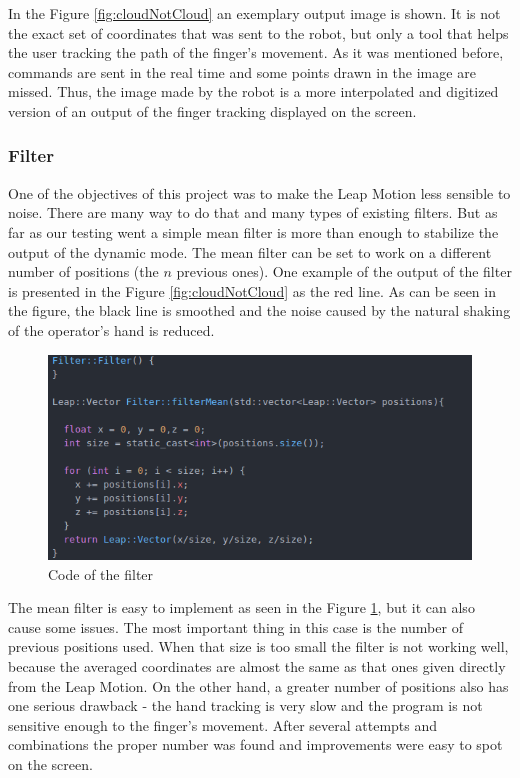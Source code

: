 In the Figure \ref{fig:cloudNotCloud} an exemplary output image is shown. It is not the exact set of coordinates that was sent to the robot, but only a tool that helps the user tracking the path of the finger's movement. As it was mentioned before, commands are sent in the real time and some points drawn in the image are missed. Thus, the image made by the robot is a more interpolated and digitized version of an output of the finger tracking displayed on the screen.

\subsubsection{Filter}

One of the objectives of this project was to make the Leap Motion less sensible to noise. There are many way to do that and many types of existing filters. But as far as our testing went a simple mean filter is more than enough to stabilize the output of the dynamic mode. The mean filter can be set to work on a different number of positions (the $n$ previous ones).
One example of the output of the filter is presented in the Figure \ref{fig:cloudNotCloud} as the red line. As can be seen in the figure, the black line is smoothed and the noise caused by the natural shaking of the operator's hand is reduced.

\begin{figure}[H]
	\includegraphics[scale = 0.5]{codeFilter}
	\centering
	\caption{Code of the filter}
	\label{fig:filter}
\end{figure}

The mean filter is easy to implement as seen in the Figure \ref{fig:filter}, but it can also cause some issues. The most important thing in this case is the number of previous positions used. When that size is too small the filter is not working well, because the averaged coordinates are almost the same as that ones given directly from the Leap Motion. On the other hand, a greater number of positions also has one serious drawback - the hand tracking is very slow and the program is not sensitive enough to the finger's movement. After several attempts and combinations the proper number was found and improvements were easy to spot on the screen.
